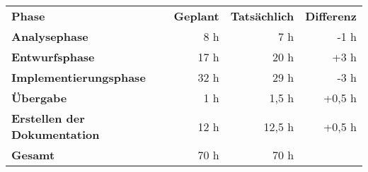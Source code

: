 \begin{tabular}{lrrr}
\rowcolor{heading}\textbf{Phase} & \textbf{Geplant} & \textbf{Tatsächlich} & \textbf{Differenz} \\
\textbf{Analysephase} & 8 h   & 7 h  & -1 h \\
\rowcolor{odd}\textbf{Entwurfsphase} & 17 h  & 20 h  & +3 h  \\
\textbf{Implementierungsphase} & 32 h  & 29 h  & -3 h \\
\rowcolor{odd}\textbf{Übergabe} & 1 h   & 1,5 h   & +0,5 h \\
\textbf{Erstellen der Dokumentation} & 12 h   & 12,5 h  & +0,5 h \\
\hline
\hline
\rowcolor{odd}\textbf{Gesamt} & 70 h  & 70 h  &  \\
\end{tabular}

